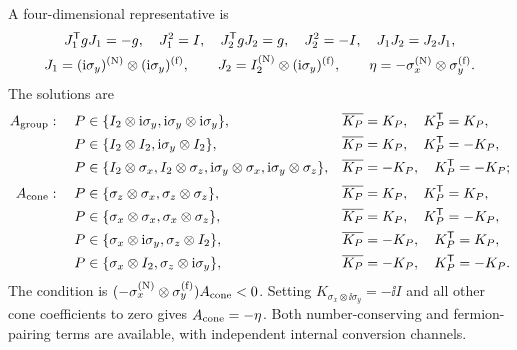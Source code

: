 A four-dimensional representative is
\begin{equation}
\begin{gathered}
J_1^{\mathsf{T}} gJ_1=-g,\quad J_1^2=I,\quad
J_2^{\mathsf{T}} gJ_2=g,\quad J_2^2=-I,\quad
J_1J_2=J_2J_1,\\
J_1=(\mathrm{i}\sigma_y)^{({\rm N})}\otimes(\mathrm{i}\sigma_y)^{({\rm f})},\qquad
J_2=I_2^{({\rm N})}\otimes(\mathrm{i}\sigma_y)^{({\rm f})},\qquad
\eta=-\sigma_x^{({\rm N})}\otimes\sigma_y^{({\rm f})}.
\end{gathered}
\end{equation}
The solutions are
\begin{align*}
A_{\rm group}:\quad
P&\in\{I_2\otimes\mathrm{i}\sigma_y,\mathrm{i}\sigma_y\otimes\mathrm{i}\sigma_y\},
&&\overline{K_P}=K_P,\quad K_P^{\mathsf{T}}=K_P,\\
P&\in\{I_2\otimes I_2,\mathrm{i}\sigma_y\otimes I_2\},
&&\overline{K_P}=K_P,\quad K_P^{\mathsf{T}}=-K_P,\\
P&\in\{I_2\otimes\sigma_x,I_2\otimes\sigma_z,
\mathrm{i}\sigma_y\otimes\sigma_x,\mathrm{i}\sigma_y\otimes\sigma_z\},
&&\overline{K_P}=-K_P,\quad K_P^{\mathsf{T}}=-K_P;\\[2pt]
A_{\rm cone}:\quad
P&\in\{\sigma_z\otimes\sigma_x,\sigma_z\otimes\sigma_z\},
&&\overline{K_P}=K_P,\quad K_P^{\mathsf{T}}=K_P,\\
P&\in\{\sigma_x\otimes\sigma_x,\sigma_x\otimes\sigma_z\},
&&\overline{K_P}=K_P,\quad K_P^{\mathsf{T}}=-K_P,\\
P&\in\{\sigma_x\otimes\mathrm{i}\sigma_y,\sigma_z\otimes I_2\},
&&\overline{K_P}=-K_P,\quad K_P^{\mathsf{T}}=K_P,\\
P&\in\{\sigma_x\otimes I_2,\sigma_z\otimes\mathrm{i}\sigma_y\},
&&\overline{K_P}=-K_P,\quad K_P^{\mathsf{T}}=-K_P.
\end{align*}
The condition is \((-\sigma_x^{({\rm N})}\otimes\sigma_y^{({\rm f})})A_{\rm cone}<0\).  Setting
\(K_{\sigma_x\otimes\ii\sigma_y}=-\ii I\) and all other cone coefficients to zero gives \(A_{\rm cone}=-\eta\).  Both number-conserving and fermion-pairing terms are available, with independent internal conversion channels.

